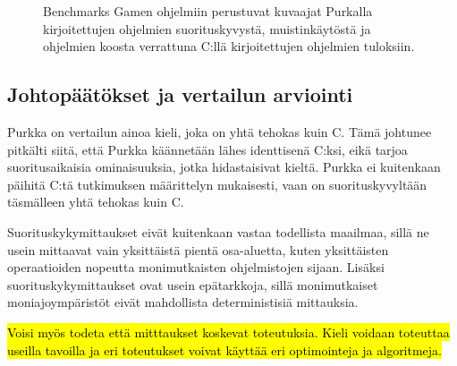 \begin{figure}[ht!]
    \begin{adjustbox}{center}
        \begin{minipage}{1.25\textwidth}
        
        \end{minipage}
    \end{adjustbox}

    \begin{adjustbox}{center}
        \begin{minipage}{1.25\textwidth}
        
        \end{minipage}
    \end{adjustbox}

    \begin{adjustbox}{center}
        \begin{minipage}{1.25\textwidth}
        
        \end{minipage}
    \end{adjustbox}
    \caption{
        Benchmarks Gamen ohjelmiin perustuvat kuvaajat Purkalla kirjoitettujen ohjelmien
        suorituskyvystä, muistinkäytöstä ja ohjelmien koosta verrattuna C:llä
        kirjoitettujen ohjelmien tuloksiin.}
    \label{fig:purkkabenchmarksgame}
\end{figure}

\FloatBarrier

\subsection{Johtopäätökset ja vertailun arviointi}

Purkka on vertailun ainoa kieli, joka on yhtä tehokas kuin C. Tämä johtunee
pitkälti siitä, että Purkka käännetään lähes identtisenä C:ksi, eikä tarjoa
suoritusaikaisia ominaisuuksia, jotka hidastaisivat kieltä. Purkka ei kuitenkaan
päihitä C:tä tutkimuksen määrittelyn mukaisesti, vaan on suorituskyvyltään
täsmälleen yhtä tehokas kuin C.

Suorituskykymittaukset eivät kuitenkaan vastaa todellista maailmaa, sillä ne
usein mittaavat vain yksittäistä pientä osa-aluetta, kuten yksittäisten
operaatioiden nopeutta monimutkaisten ohjelmistojen sijaan. Lisäksi
suorituskykymittaukset ovat usein epätarkkoja, sillä monimutkaiset
moniajoympäristöt eivät mahdollista deterministisiä mittauksia.

\hl{Voisi myös todeta että mitttaukset koskevat toteutuksia. Kieli voidaan
toteuttaa useilla tavoilla ja eri toteutukset voivat käyttää eri optimointeja
ja algoritmeja.}

